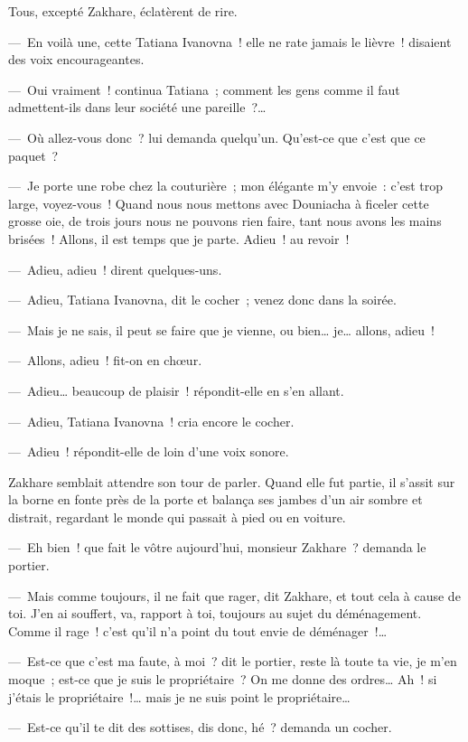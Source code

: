 \documentclass[french,twoside]{book} %
\begin{document}
Tous, excepté Zakhare, éclatèrent de rire.\par
— En voilà une, cette Tatiana Ivanovna ! elle ne rate jamais le lièvre ! disaient des voix encourageantes.\par
— Oui vraiment ! continua Tatiana ; comment les gens comme il faut admettent-ils dans leur société une pareille ?…\par
— Où allez-vous donc ? lui demanda quelqu’un. Qu’est-ce que c’est que ce paquet ?\par
— Je porte une robe chez la couturière ; mon élégante m’y envoie : c’est trop large, voyez-vous ! Quand nous nous mettons avec Douniacha à ficeler cette grosse oie, de trois jours nous ne pouvons rien faire, tant nous avons les mains brisées ! Allons, il est temps que je parte. Adieu ! au revoir !\par
— Adieu, adieu ! dirent quelques-uns.\par
— Adieu, Tatiana Ivanovna, dit le cocher ; venez donc dans la soirée.\par
— Mais je ne sais, il peut se faire que je vienne, ou bien… je… allons, adieu !\par
— Allons, adieu ! fit-on en chœur.\par
— Adieu… beaucoup de plaisir ! répondit-elle en s’en allant.\par
— Adieu, Tatiana Ivanovna ! cria encore le cocher.\par
— Adieu ! répondit-elle de loin d’une voix sonore.\par
Zakhare semblait attendre son tour de parler. Quand elle fut partie, il s’assit sur la borne en fonte près de la porte et balança ses jambes d’un air sombre et distrait, regardant le monde qui passait à pied ou en voiture.\par
— Eh bien ! que fait le vôtre aujourd’hui, monsieur Zakhare ? demanda le portier.\par
— Mais comme toujours, il ne fait que rager, dit Zakhare, et tout cela à cause de toi. J’en ai souffert, va, rapport à toi, toujours au sujet du déménagement. Comme il rage ! c’est qu’il n’a point du tout envie de déménager !…\par
— Est-ce que c’est ma faute, à moi ? dit le portier, reste là toute ta vie, je m’en moque ; est-ce que je suis le propriétaire ? On me donne des ordres… Ah ! si j’étais le propriétaire !… mais je ne suis point le propriétaire…\par
— Est-ce qu’il te dit des sottises, dis donc, hé ? demanda un cocher.\par
\end{document}
